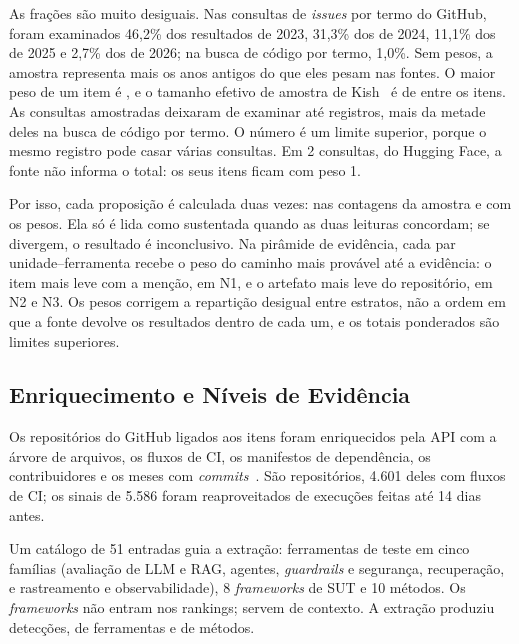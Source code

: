 \documentclass[sigconf]{acmart}
\newcommand{\ColSemTotal}{2}             %
\newcommand{\EvReposCI}{4.601}           %
\newcommand{\EvReposReuso}{5.586}        %
\begin{document}
As frações são muito desiguais. Nas consultas de \textit{issues} por termo do GitHub, foram examinados 46,2\% dos resultados de 2023, 31,3\% dos de 2024, 11,1\% dos de 2025 e 2,7\% dos de 2026; na busca de código por termo, 1,0\%. Sem pesos, a amostra representa mais os anos antigos do que eles pesam nas fontes. O maior peso de um item é \ResPesoMax, e o tamanho efetivo de amostra de Kish~\cite{kish1965survey} é de \ResNEfetivo{} entre os \ResItens{} itens. As consultas amostradas deixaram de examinar até \ResPrismaNaoExaminados{} registros, mais da metade deles na busca de código por termo. O número é um limite superior, porque o mesmo registro pode casar várias consultas. Em \ColSemTotal{} consultas, do Hugging Face, a fonte não informa o total: os seus \ResItensPesoDesconhecido{} itens ficam com peso 1.

Por isso, cada proposição é calculada duas vezes: nas contagens da amostra e com os pesos. Ela só é lida como sustentada quando as duas leituras concordam; se divergem, o resultado é inconclusivo. Na pirâmide de evidência, cada par unidade--ferramenta recebe o peso do caminho mais provável até a evidência: o item mais leve com a menção, em N1, e o artefato mais leve do repositório, em N2 e N3. Os pesos corrigem a repartição desigual entre estratos, não a ordem em que a fonte devolve os resultados dentro de cada um, e os totais ponderados são limites superiores.

\subsection{Enriquecimento e Níveis de Evidência}
\label{sec:met-niveis}

Os repositórios do GitHub ligados aos itens foram enriquecidos pela API com a árvore de arquivos, os fluxos de CI, os manifestos de dependência, os contribuidores e os meses com \textit{commits}~\cite{kalliamvakou2014promises,msrkit2027}. São \ResReposEnriquecidos{} repositórios, \EvReposCI{} deles com fluxos de CI; os sinais de \EvReposReuso{} foram reaproveitados de execuções feitas até 14 dias antes.

Um catálogo de 51 entradas guia a extração: \ResFerramentasTeste{} ferramentas de teste em cinco famílias (avaliação de LLM e RAG, agentes, \textit{guardrails} e segurança, recuperação, e rastreamento e observabilidade), 8 \textit{frameworks} de SUT e 10 métodos. Os \textit{frameworks} não entram nos rankings; servem de contexto. A extração produziu \ResDeteccoes{} detecções, \ResDeteccoesFerramenta{} de ferramentas e \ResDeteccoesMetodo{} de métodos.
\end{document}
